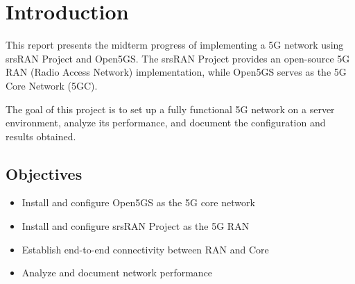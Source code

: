 \section{Introduction}
This report presents the midterm progress of implementing a 5G network 
using srsRAN Project and Open5GS. The srsRAN Project provides an open-source 
5G RAN (Radio Access Network) implementation, while Open5GS serves as the 
5G Core Network (5GC).

The goal of this project is to set up a fully functional 5G network on a 
server environment, analyze its performance, and document the configuration 
and results obtained.

\subsection{Objectives}
\begin{itemize}
    \item Install and configure Open5GS as the 5G core network
    \item Install and configure srsRAN Project as the 5G RAN
    \item Establish end-to-end connectivity between RAN and Core
    \item Analyze and document network performance
\end{itemize} 

